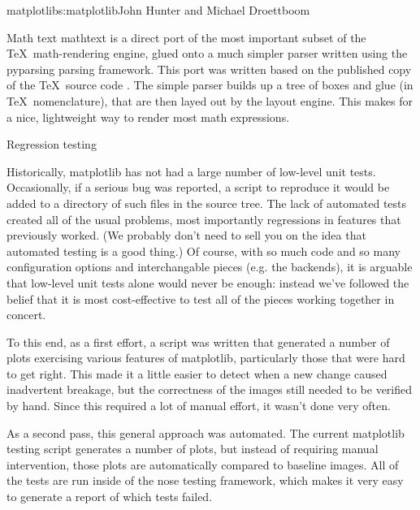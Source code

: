 \begin{aosachapter}{matplotlib}{s:matplotlib}{John Hunter and Michael Droettboom}
\begin{aosasect1}{Math text}
mathtext is a direct port of the most important subset of the
\TeX\ math-rendering engine, glued onto a much simpler parser written
using the pyparsing \cite{bib:pyparsing} parsing framework.  This port
was written based on the published copy of the \TeX\ source code
\cite{bib:texprogram}.  The simple parser builds up a tree of boxes
and glue (in \TeX\ nomenclature), that are then layed out by the
layout engine.  This makes for a nice, lightweight way to render most
math expressions.

\end{aosasect1}

\begin{aosasect1}{Regression testing}

  Historically, matplotlib has not had a large number of low-level
  unit tests.  Occasionally, if a serious bug was reported, a script
  to reproduce it would be added to a directory of such files in the
  source tree.  The lack of automated tests created all of the usual
  problems, most importantly regressions in features that previously
  worked.  (We probably don't need to sell you on the idea that
  automated testing is a good thing.)  Of course, with so much code
  and so many configuration options and interchangable pieces
  (e.g. the backends), it is arguable that low-level unit tests alone
  would never be enough: instead we've followed the belief that it is
  most cost-effective to test all of the pieces working together in
  concert.

To this end, as a first effort, a script was written that generated a
number of plots exercising various features of matplotlib,
particularly those that were hard to get right.  This made it a little
easier to detect when a new change caused inadvertent breakage, but
the correctness of the images still needed to be verified by hand.
Since this required a lot of manual effort, it wasn't done very often.

As a second pass, this general approach was automated.  The current
matplotlib testing script generates a number of plots, but instead of
requiring manual intervention, those plots are automatically compared
to baseline images.  All of the tests are run inside of the nose
testing framework, which makes it very easy to generate a report of
which tests failed.


\end{aosasect1}
\end{aosachapter}
